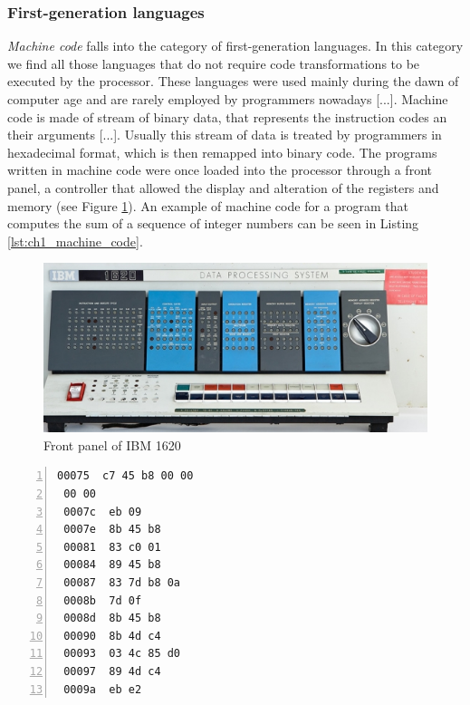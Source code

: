 \subsubsection*{First-generation languages}
\textit{Machine code} falls into the category of first-generation languages. In this category we find all those languages that do not require code transformations to be executed by the processor. These languages were used mainly during the dawn of computer age and are rarely employed by programmers nowadays [...]. Machine code is made of stream of binary data, that represents the instruction codes an their arguments [...]. Usually this stream of data is treated by programmers in hexadecimal format, which is then remapped into binary code. The programs written in machine code were once loaded into the processor through a front panel, a controller that allowed the display and alteration of the registers and memory (see Figure \ref{fig:ch1_front_panel}). An example of machine code for a program that computes the sum of a sequence of integer numbers can be seen in Listing \ref{lst:ch1_machine_code}.

\begin{figure}
	\centering
	\includegraphics[width = \textwidth]{Figures/ch1_front_panel}
	\caption{Front panel of IBM 1620}
	\label{fig:ch1_front_panel}
\end{figure}

\begin{minipage}{\linewidth}
\begin{lstlisting}[numbers = left, caption = Machine code to compute the sum of a sequence of numbers, label = lst:ch1_machine_code]
 00075	c7 45 b8 00 00
 00 00
 0007c	eb 09	
 0007e	8b 45 b8
 00081	83 c0 01
 00084	89 45 b8
 00087	83 7d b8 0a
 0008b	7d 0f
 0008d	8b 45 b8
 00090	8b 4d c4
 00093	03 4c 85 d0
 00097	89 4d c4
 0009a	eb e2
\end{lstlisting}
\end{minipage}

